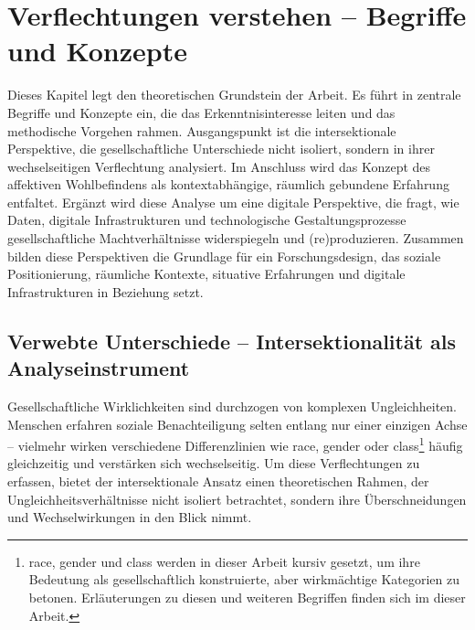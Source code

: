 
\chapter{Verflechtungen verstehen -- Begriffe und Konzepte} \label{sec:theoretischer_rahmen}

Dieses Kapitel legt den theoretischen Grundstein der Arbeit. Es führt in zentrale Begriffe und Konzepte ein, die das Erkenntnisinteresse leiten und das methodische Vorgehen rahmen. Ausgangspunkt ist die intersektionale Perspektive, die gesellschaftliche Unterschiede nicht isoliert, sondern in ihrer wechselseitigen Verflechtung analysiert. Im Anschluss wird das Konzept des affektiven Wohlbefindens als kontextabhängige, räumlich gebundene Erfahrung entfaltet. Ergänzt wird diese Analyse um eine digitale Perspektive, die fragt, wie Daten, digitale Infrastrukturen und technologische Gestaltungsprozesse gesellschaftliche Machtverhältnisse widerspiegeln und (re)produzieren. Zusammen bilden diese Perspektiven die Grundlage für ein Forschungsdesign, das soziale Positionierung, räumliche Kontexte, situative Erfahrungen und digitale Infrastrukturen in Beziehung setzt.

\section{Verwebte Unterschiede -- Intersektionalität als Analyseinstrument}

Gesellschaftliche Wirklichkeiten sind durchzogen von komplexen Ungleichheiten. Menschen erfahren soziale Benachteiligung selten entlang nur einer einzigen Achse -- vielmehr wirken verschiedene Differenzlinien wie \gls{race}, \gls{gender} oder \gls{class}\footnote{\gls{race}, \gls{gender} und \gls{class} werden in dieser Arbeit kursiv gesetzt, um ihre Bedeutung als gesellschaftlich konstruierte, aber wirkmächtige Kategorien zu betonen. Erläuterungen zu diesen und weiteren Begriffen finden sich im  dieser Arbeit.} häufig gleichzeitig und verstärken sich wechselseitig. Um diese Verflechtungen zu erfassen, bietet der intersektionale Ansatz einen theoretischen Rahmen, der Ungleichheitsverhältnisse nicht isoliert betrachtet, sondern ihre Überschneidungen und Wechselwirkungen in den Blick nimmt.


